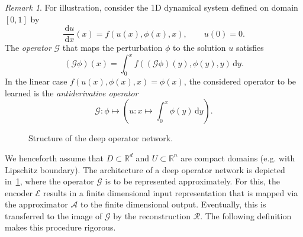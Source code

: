 \documentclass[12pt]{article}
\theoremstyle{remark}
\newtheorem{remark}[theorem]{Remark}
\theoremstyle{plain}
\numberwithin{equation}{section}
\newcommand{\dd}{\ensuremath{\,\mathrm d}}
\newcommand{\R}{\mathbb{R}}
\begin{document}
\begin{remark}
For illustration, consider the 1D dynamical system defined on domain $[0,1]$ by
\begin{equation*}
    \frac{\dd u}{\dd x}(x) = f(u(x), \phi(x), x),\qquad u(0)=0.
\end{equation*}
The \emph{operator} $\mathcal G$ that maps the perturbation $\phi$ to the solution $u$ satisfies
\begin{equation*}
    (\mathcal G \phi)(x) = \int_0^x f((\mathcal G \phi)(y), \phi(y), y)\dd y.
\end{equation*}
In the linear case $f(u(x), \phi(x), x) = \phi(x)$, the considered operator to be learned is the \emph{antiderivative operator}
\begin{equation*}
    \mathcal G : \phi \mapsto \left(u: x \mapsto \int_0^x \phi(y)\dd y\right).
\end{equation*}
\end{remark}

\begin{figure}
    \centering
    \caption{Structure of the deep operator network.}
    \label{fig:DeepONet_diagram}
\end{figure}

We henceforth assume that $D \subset \R^d$ and $U \subset \R^n$ are compact domains (e.g. with Lipschitz boundary).
The architecture of a deep operator network is depicted in~\cref{fig:DeepONet_diagram}, where the operator $\mathcal G$ is to be represented approximately.
For this, the encoder $\mathcal E$ results in a finite dimensional input representation that is mapped via the approximator $\mathcal A$ to the finite dimensional output.
Eventually, this is transferred to the image of $\mathcal G$ by the reconstruction $\mathcal R$.
The following definition makes this procedure rigorous.
\end{document}
